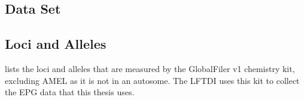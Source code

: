 
\begin{theappendices}


\chapter{Data Set}
\thispagestyle{myheadings}

\section{Loci and Alleles}
\label{appendix:section:Loci and Alleles}

 lists the loci and alleles that are measured by the GlobalFiler v1 chemistry kit, excluding AMEL as it is not in an autosome. The LFTDI uses this kit to collect the EPG data that this thesis uses.


\end{theappendices}
